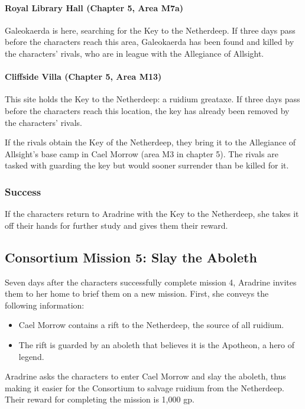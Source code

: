 \documentclass[10pt,a4paper,twoside,bg=print,twocolumn,openany,nodeprecatedcode]{dndbook}
\begin{document}
\paragraph{Royal Library Hall (Chapter 5, Area M7a)}
Galeokaerda is here, searching for the Key to the Netherdeep. If three days pass before the characters reach this area, Galeokaerda has been found and killed by the characters' rivals, who are in league with the Allegiance of Allsight.

\paragraph{Cliffside Villa (Chapter 5, Area M13)}
This site holds the Key to the Netherdeep: a ruidium greataxe. If three days pass before the characters reach this location, the key has already been removed by the characters' rivals.

If the rivals obtain the Key of the Netherdeep, they bring it to the Allegiance of Allsight's base camp in Cael Morrow (area M3 in chapter 5). The rivals are tasked with guarding the key but would sooner surrender than be killed for it.

\subsubsection{Success}
If the characters return to Aradrine with the Key to the Netherdeep, she takes it off their hands for further study and gives them their reward.

\subsection{Consortium Mission 5: Slay the Aboleth}
Seven days after the characters successfully complete mission 4, Aradrine invites them to her home to brief them on a new mission. First, she conveys the following information:


\begin{itemize}
\item Cael Morrow contains a rift to the Netherdeep, the source of all ruidium.
\item The rift is guarded by an aboleth that believes it is the Apotheon, a hero of legend.
\end{itemize}

Aradrine asks the characters to enter Cael Morrow and slay the aboleth, thus making it easier for the Consortium to salvage ruidium from the Netherdeep. Their reward for completing the mission is 1,000 gp.
\end{document}
